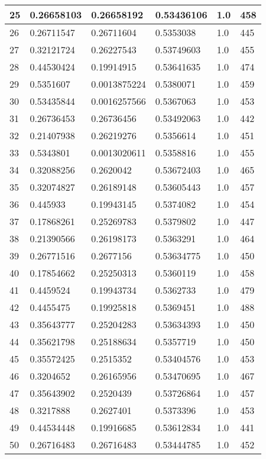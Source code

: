 \begin{longtable}{|l|l|l|l|l|l|}
25 & 0.26658103 & 0.26658192 & 0.53436106 & 1.0 & 458 \\ \hline 
26 & 0.26711547 & 0.26711604 & 0.5353038 & 1.0 & 445 \\ \hline 
27 & 0.32121724 & 0.26227543 & 0.53749603 & 1.0 & 455 \\ \hline 
28 & 0.44530424 & 0.19914915 & 0.53641635 & 1.0 & 474 \\ \hline 
29 & 0.5351607 & 0.0013875224 & 0.5380071 & 1.0 & 459 \\ \hline 
30 & 0.53435844 & 0.0016257566 & 0.5367063 & 1.0 & 453 \\ \hline 
31 & 0.26736453 & 0.26736456 & 0.53492063 & 1.0 & 442 \\ \hline 
32 & 0.21407938 & 0.26219276 & 0.5356614 & 1.0 & 451 \\ \hline 
33 & 0.5343801 & 0.0013020611 & 0.5358816 & 1.0 & 455 \\ \hline 
34 & 0.32088256 & 0.2620042 & 0.53672403 & 1.0 & 465 \\ \hline 
35 & 0.32074827 & 0.26189148 & 0.53605443 & 1.0 & 457 \\ \hline 
36 & 0.445933 & 0.19943145 & 0.5374082 & 1.0 & 454 \\ \hline 
37 & 0.17868261 & 0.25269783 & 0.5379802 & 1.0 & 447 \\ \hline 
38 & 0.21390566 & 0.26198173 & 0.5363291 & 1.0 & 464 \\ \hline 
39 & 0.26771516 & 0.2677156 & 0.53634775 & 1.0 & 450 \\ \hline 
40 & 0.17854662 & 0.25250313 & 0.5360119 & 1.0 & 458 \\ \hline 
41 & 0.4459524 & 0.19943734 & 0.5362733 & 1.0 & 479 \\ \hline 
42 & 0.4455475 & 0.19925818 & 0.5369451 & 1.0 & 488 \\ \hline 
43 & 0.35643777 & 0.25204283 & 0.53634393 & 1.0 & 450 \\ \hline 
44 & 0.35621798 & 0.25188634 & 0.5357719 & 1.0 & 450 \\ \hline 
45 & 0.35572425 & 0.2515352 & 0.53404576 & 1.0 & 453 \\ \hline 
46 & 0.3204652 & 0.26165956 & 0.53470695 & 1.0 & 467 \\ \hline 
47 & 0.35643902 & 0.2520439 & 0.53726864 & 1.0 & 457 \\ \hline 
48 & 0.3217888 & 0.2627401 & 0.5373396 & 1.0 & 453 \\ \hline 
49 & 0.44534448 & 0.19916685 & 0.53612834 & 1.0 & 441 \\ \hline 
50 & 0.26716483 & 0.26716483 & 0.53444785 & 1.0 & 452 \\ \hline 
\end{longtable}